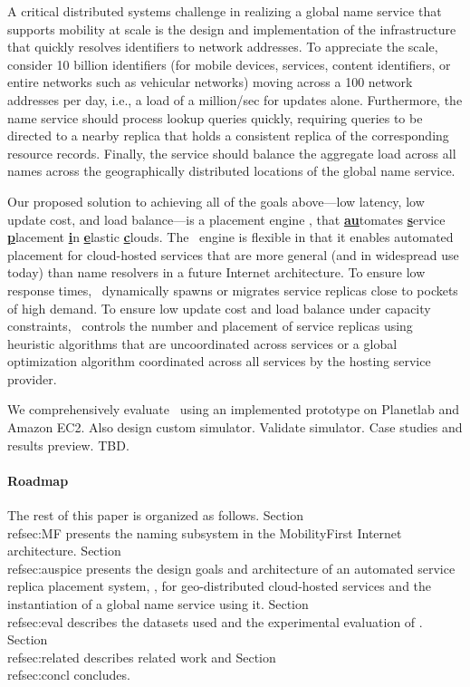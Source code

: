 {A critical distributed systems challenge in realizing a global name service that supports mobility at scale  is the design and implementation of the infrastructure that quickly resolves identifiers to network addresses. To appreciate the scale, consider 10 billion identifiers (for mobile devices, services, content identifiers, or entire networks such as vehicular networks) moving across a 100 network addresses per day, i.e., a load of a million/sec for updates alone. Furthermore, the name service should process lookup queries quickly, requiring queries to be directed to a nearby replica that holds a consistent replica of the corresponding resource records. Finally, the service should balance the aggregate load across all names across the geographically distributed locations of the global name service. 

Our proposed solution to achieving all of the goals above---low latency, low update cost, and load balance---is a placement engine \auspice, that {\underline{\bf au}}tomates {\underline{\bf s}}ervice {\underline{\bf p}}lacement {\underline{\bf i}}n {\underline{\bf e}}lastic {\underline{\bf c}}louds. The \auspice\ engine is flexible in that it enables automated placement for cloud-hosted services that are more general (and in widespread use today) than name resolvers in a future Internet architecture. To ensure low response times, \auspice\ dynamically spawns or migrates service replicas close to pockets of high demand. To ensure low update cost and load balance under capacity constraints, \auspice\ controls the number and placement of service replicas using heuristic algorithms that are uncoordinated across services or a global optimization algorithm coordinated across all services by the hosting service provider.

We comprehensively evaluate \auspice\ using an implemented prototype on Planetlab and Amazon EC2. Also design custom simulator. Validate simulator. Case studies and results preview. TBD.

\paragraph{Roadmap} The rest of this paper is organized as follows. Section \\ref{sec:MF} presents the naming subsystem in the MobilityFirst Internet architecture. Section \\ref{sec:auspice} presents the design goals and architecture of an automated service replica placement system, \auspice, for geo-distributed cloud-hosted services and the instantiation of a global name service using it. Section \\ref{sec:eval} describes the datasets used and the experimental evaluation of \auspice. Section \\ref{sec:related} describes related work and Section \\ref{sec:concl} concludes.

}
